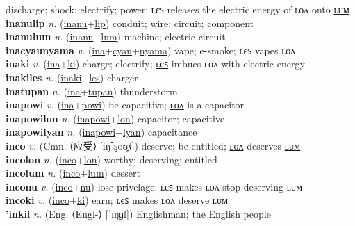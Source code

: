 discharge; shock; electrify; power; ʟєꜱ releases the electric energy of ʟᴏᴧ onto \hyperref[inanulum]{ʟᴜᴍ} \label{inanu} \\
\textbf{inanulip} \textit{n.} (\hyperref[inanu]{inanu}+\hyperref[lip]{lip})
conduit; wire; circuit; component \label{inanulip} \\
\textbf{inanulum} \textit{n.} (\hyperref[inanu]{inanu}+\hyperref[lum]{lum})
machine; electric circuit \label{inanulum} \\
\textbf{inacyaunyama} \textit{v.} (\hyperref[ina]{ina}+\hyperref[cyau]{cyau}+\hyperref[nyama]{nyama})
vape; e-smoke; ʟєꜱ vapes ʟᴏᴧ \label{inacyaunyama} \\
\textbf{inaki} \textit{v.} (\hyperref[ina]{ina}+\hyperref[ki]{ki})
charge; electrify; \hyperref[inakiles]{ʟєꜱ} imbues ʟᴏᴧ with electric energy \label{inaki} \\
\textbf{inakiles} \textit{n.} (\hyperref[inaki]{inaki}+\hyperref[les]{les})
charger \label{inakiles} \\
\textbf{inatupan} \textit{n.} (\hyperref[ina]{ina}+\hyperref[tupan]{tupan})
thunderstorm \label{inatupan} \\
\textbf{inapowi} \textit{v.} (\hyperref[ina]{ina}+\hyperref[powi]{powi})
be capacitive; \hyperref[inapowilon]{ʟᴏᴧ} is a capacitor \label{inapowi} \\
\textbf{inapowilon} \textit{n.} (\hyperref[inapowi]{inapowi}+\hyperref[lon]{lon})
capacitor; capacitive \label{inapowilon} \\
\textbf{inapowilyan} \textit{n.} (\hyperref[inapowi]{inapowi}+\hyperref[lyan]{lyan})
capacitance \label{inapowilyan} \\
\textbf{inco} \textit{v.} (Cmn. ⟨应受⟩ [iŋ˥ʂoʊ̯˥˩])
deserve; be entitled; \hyperref[incolon]{ʟᴏᴧ} deserves \hyperref[incolum]{ʟᴜᴍ} \label{inco} \\
\textbf{incolon} \textit{n.} (\hyperref[inco]{inco}+\hyperref[lon]{lon})
worthy; deserving; entitled \label{incolon} \\
\textbf{incolum} \textit{n.} (\hyperref[inco]{inco}+\hyperref[lum]{lum})
dessert \label{incolum} \\
\textbf{inconu} \textit{v.} (\hyperref[inco]{inco}+\hyperref[nu]{nu})
lose privelage; ʟєꜱ makes ʟᴏᴧ stop deserving ʟᴜᴍ \label{inconu} \\
\textbf{incoki} \textit{v.} (\hyperref[inco]{inco}+\hyperref[ki]{ki})
earn; ʟєꜱ makes ʟᴏᴧ deserve ʟᴜᴍ \label{incoki} \\
\textbf{'inkil} \textit{n.} (Eng. ⟨Engl-⟩ [ˈɪŋɡl])
Englishman; the English people \label{'inkil} \\
